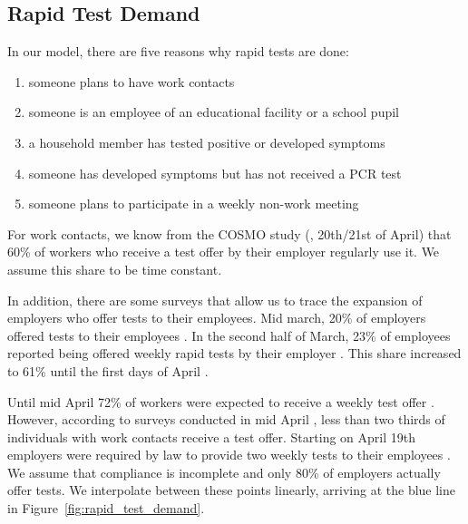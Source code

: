 \subsection{Rapid Test Demand}
\label{subsec:rapid_test_demand}

In our model, there are five reasons why rapid tests are done:

\begin{enumerate}
    \item someone plans to have work contacts
    \item someone is an employee of an educational facility or a school pupil
    \item a household member has tested positive or developed symptoms
    \item someone has developed symptoms but has not received a PCR test
    \item someone plans to participate in a weekly non-work meeting
\end{enumerate}


For work contacts, we know from the COSMO study (\cite{Betsch2021}, 20th/21st of April)
that 60\% of workers who receive a test offer by their employer regularly use it. We
assume this share to be time constant.

In addition, there are some surveys that allow us to trace the expansion of employers who
offer tests to their employees. Mid march, 20\% of employers offered tests to their
employees \citep{DIHK2021}. In the second half of March, 23\% of employees reported being
offered weekly rapid tests by their employer \citep{Ahlers2021}. This share increased to
61\% until the first days of April \citep{BMWI2021, IZA2021}.

Until mid April 72\% of workers were expected to receive a weekly test offer
\citep{BMWI2021, IZA2021}. However, according to surveys conducted in mid April
\citep{Betsch2021}, less than two thirds of individuals with work contacts receive a test
offer. Starting on April 19th employers were required by law to provide two weekly tests
to their employees \citep{Bundesanzeiger2021}. We assume that compliance is incomplete
and only 80\% of employers actually offer tests. We interpolate between these points
linearly, arriving at the blue line in Figure~\ref{fig:rapid_test_demand}.


